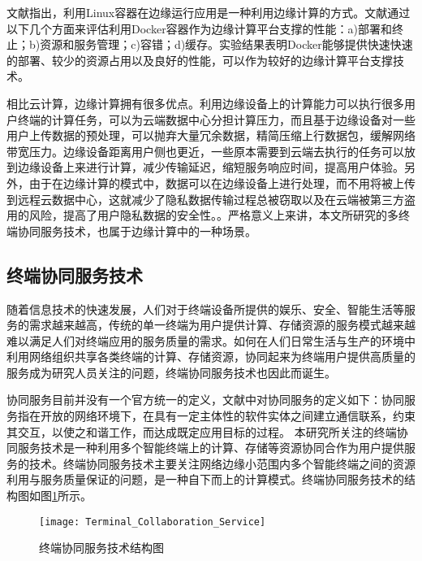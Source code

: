 文献\cite{Ismail2016Evaluation}指出，利用Linux容器在边缘运行应用是一种利用边缘计算的方式。文献通过以下几个方面来评估利用Docker容器作为边缘计算平台支撑的性能：a)部署和终止；b)资源和服务管理；c)容错；d)缓存。实验结果表明Docker能够提供快速快速的部署、较少的资源占用以及良好的性能，可以作为较好的边缘计算平台支撑技术。


相比云计算，边缘计算拥有很多优点\cite{赵梓铭2018边缘计算}。利用边缘设备上的计算能力可以执行很多用户终端的计算任务，可以为云端数据中心分担计算压力，而且基于边缘设备对一些用户上传数据的预处理，可以抛弃大量冗余数据，精简压缩上行数据包，缓解网络带宽压力。边缘设备距离用户侧也更近，一些原本需要到云端去执行的任务可以放到边缘设备上来进行计算，减少传输延迟，缩短服务响应时间，提高用户体验。另外，由于在边缘计算的模式中，数据可以在边缘设备上进行处理，而不用将被上传到远程云数据中心，这就减少了隐私数据传输过程总被窃取以及在云端被第三方盗用的风险，提高了用户隐私数据的安全性。。严格意义上来讲，本文所研究的多终端协同服务技术，也属于边缘计算中的一种场景。


\subsection{终端协同服务技术}
随着信息技术的快速发展，人们对于终端设备所提供的娱乐、安全、智能生活等服务的需求越来越高，传统的单一终端为用户提供计算、存储资源的服务模式越来越难以满足人们对终端应用的服务质量的需求。如何在人们日常生活与生产的环境中利用网络组织共享各类终端的计算、存储资源，协同起来为终端用户提供高质量的服务成为研究人员关注的问题，终端协同服务技术也因此而诞生。


协同服务目前并没有一个官方统一的定义，文献\cite{张静乐2011协同服务}中对协同服务的定义如下：协同服务指在开放的网络环境下，在具有一定主体性的软件实体之间建立通信联系，约束其交互，以使之和谐工作，而达成既定应用目标的过程。
本研究所关注的终端协同服务技术是一种利用多个智能终端上的计算、存储等资源协同合作为用户提供服务的技术。终端协同服务技术主要关注网络边缘小范围内多个智能终端之间的资源利用与服务质量保证的问题，是一种自下而上的计算模式。终端协同服务技术的结构图如图\ref{fig:terminal_collaboration_service}所示。

\begin{figure}[!htbp]
    \centering
    \texttt{[image: Terminal\_Collaboration\_Service]}
    \caption{终端协同服务技术结构图}
    \label{fig:terminal_collaboration_service}
\end{figure}

